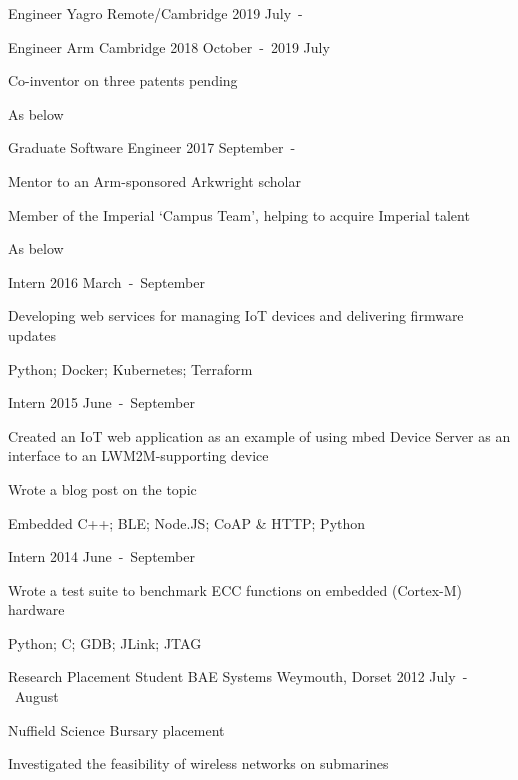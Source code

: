 \begin{cventries}

\cventry
  {Engineer}
  {Yagro}
  {Remote/Cambridge}
  {2019 July~-}
  {\begin{cvitems}
  \end{cvitems}}

\cventry
  {Engineer}
  {Arm}
  {Cambridge}
  {2018 October~-~2019 July}
  {\begin{cvitems}
    \item {Co-inventor on three patents pending}
    \item {As below}
  \end{cvitems}}

\cventryprevrole
  {Graduate Software Engineer}
  {2017 September~-}
  {\begin{cvitems}
    \item {Mentor to an Arm-sponsored Arkwright scholar}
    \item {Member of the Imperial `Campus Team', helping to acquire Imperial talent}
    \item {As below}
  \end{cvitems}}

\cventryprevrole
  {Intern}
  {2016 March~-~September}
  {\begin{cvitems}
    \item {Developing web services for managing IoT devices and delivering firmware updates}
    \item {Python; Docker; Kubernetes; Terraform}
  \end{cvitems}}

\cventryprevrole
  {Intern}
  {2015 June~-~September}
  {\begin{cvitems}
    \item {Created an IoT web application as an example of using mbed Device Server as an interface to an LWM2M-supporting device}
    \item {Wrote a blog post on the topic}
    \item {Embedded C++; BLE; Node.JS; CoAP \& HTTP; Python}
  \end{cvitems}}

\cventryprevrole
  {Intern}
  {2014 June~-~September}
  {\begin{cvitems}
    \item {Wrote a test suite to benchmark ECC functions on embedded (Cortex-M) hardware}
    \item {Python; C; GDB; JLink; JTAG}
  \end{cvitems}}

\cventry
  {Research Placement Student}
  {BAE Systems}
  {Weymouth, Dorset}
  {2012 July~-~August}
  {\begin{cvitems}
    \item {Nuffield Science Bursary placement}
    \item {Investigated the feasibility of wireless networks on submarines}
  \end{cvitems}}

\end{cventries}
